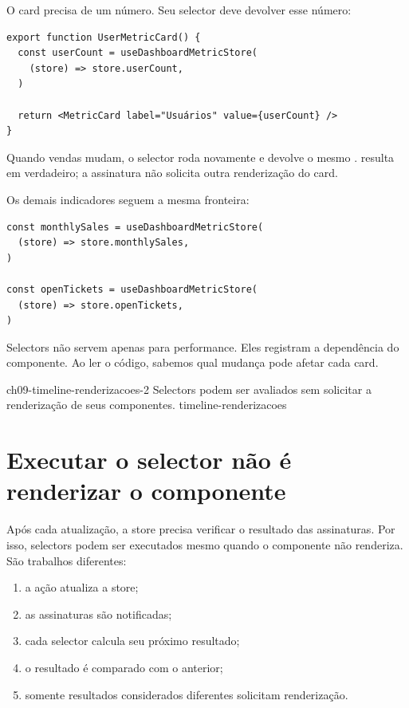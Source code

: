 O card precisa de um número. Seu selector deve devolver esse número:

\begin{lstlisting}[caption={Assinatura mínima do card de usuários.},label={lst:user-minimal-selector}]
export function UserMetricCard() {
  const userCount = useDashboardMetricStore(
    (store) => store.userCount,
  )

  return <MetricCard label="Usuários" value={userCount} />
}
\end{lstlisting}

Quando vendas mudam, o selector roda novamente e devolve o mesmo
.  resulta em verdadeiro; a
assinatura não solicita outra renderização do card.

Os demais indicadores seguem a mesma fronteira:

\begin{lstlisting}
const monthlySales = useDashboardMetricStore(
  (store) => store.monthlySales,
)

const openTickets = useDashboardMetricStore(
  (store) => store.openTickets,
)
\end{lstlisting}

Selectors não servem apenas para performance. Eles registram a dependência do
componente. Ao ler o código, sabemos qual mudança pode afetar cada card.

\imagemcapitulo
  {ch09-timeline-renderizacoes-2}
  {Selectors podem ser avaliados sem solicitar a renderização de seus componentes.}
  {timeline-renderizacoes}

\section{Executar o selector não é renderizar o componente}

Após cada atualização, a store precisa verificar o resultado das assinaturas.
Por isso, selectors podem ser executados mesmo quando o componente não
renderiza. São trabalhos diferentes:

\begin{enumerate}
  \item a ação atualiza a store;
  \item as assinaturas são notificadas;
  \item cada selector calcula seu próximo resultado;
  \item o resultado é comparado com o anterior;
  \item somente resultados considerados diferentes solicitam renderização.
\end{enumerate}

